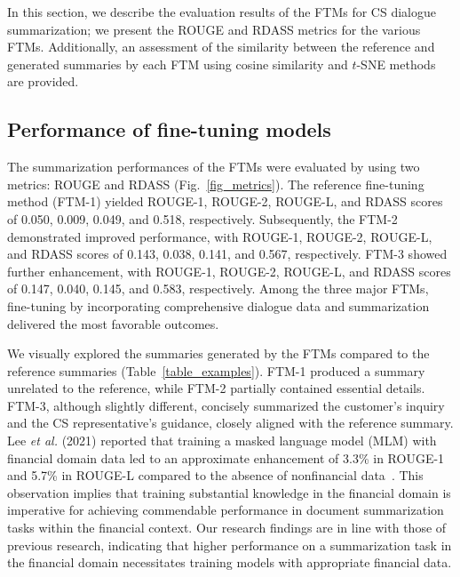 \documentclass[sigconf]{acmart}
\begin{document}
In this section, we describe the evaluation results of the FTMs for CS dialogue summarization; we present the ROUGE and RDASS metrics for the various FTMs. Additionally, an assessment of the similarity between the reference and generated summaries by each FTM using cosine similarity and $t$-SNE methods are provided.





\subsection{Performance of fine-tuning models}
The summarization performances of the FTMs were evaluated by using two metrics: ROUGE and RDASS (Fig.~\ref{fig_metrics}). The reference fine-tuning method (FTM-1) yielded ROUGE-1, ROUGE-2, ROUGE-L, and RDASS scores of 0.050, 0.009, 0.049, and 0.518, respectively. Subsequently, the FTM-2  demonstrated improved performance, with ROUGE-1, ROUGE-2, ROUGE-L, and RDASS scores of 0.143, 0.038, 0.141, and 0.567, respectively. FTM-3 showed further enhancement, with ROUGE-1, ROUGE-2, ROUGE-L, and RDASS scores of 0.147, 0.040, 0.145, and 0.583, respectively. Among the three major FTMs, fine-tuning by incorporating comprehensive dialogue data and summarization delivered the most favorable outcomes.

 

We visually explored the summaries generated by the FTMs compared to the reference summaries (Table~\ref{table_examples}). FTM-1 produced a summary unrelated to the reference, while FTM-2 partially contained essential details. FTM-3, although slightly different, concisely summarized the customer's inquiry and the CS representative's guidance, closely aligned with the reference summary. Lee {\it et al.} (2021) reported that training a masked language model (MLM) with financial domain data led to an approximate enhancement of 3.3\% in ROUGE-1 and 5.7\% in ROUGE-L compared to the absence of nonfinancial data~\cite{lee2021optimizing}. This observation implies that training substantial knowledge in the financial domain is imperative for achieving commendable performance in document summarization tasks within the financial context. Our research findings are in line with those of  previous research, indicating that higher performance on a summarization task in the financial domain necessitates training models with appropriate financial data. 
\end{document}
